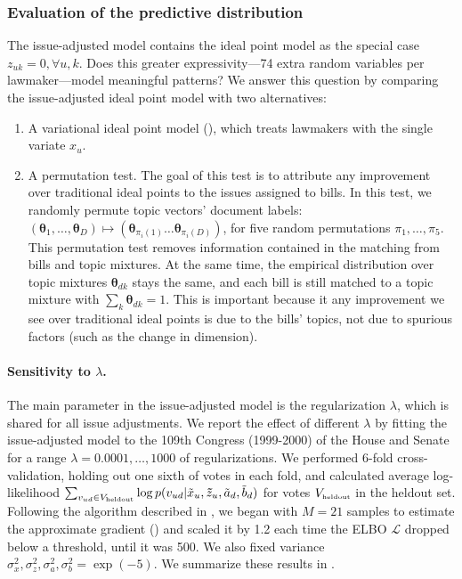 \subsubsection{Evaluation of the predictive distribution}

The issue-adjusted model contains the ideal point model as the
special case $z_{uk}=0, \forall u, k$. Does this greater
expressivity---74 extra random variables per lawmaker---model
meaningful patterns?  We answer this question by comparing the
issue-adjusted ideal point model with two alternatives:

\begin{enumerate}
\item A variational ideal point model (), which treats
  lawmakers with the single variate $x_u$.

\item A permutation test.  The goal of this test is to attribute any
  improvement over traditional ideal points to the issues assigned to
  bills.  In this test, we randomly permute topic vectors' document
  labels: $(\bm \theta_1, \ldots, \bm \theta_D) \mapsto (\bm
  \theta_{\pi_i(1)} \ldots \bm \theta_{\pi_i(D)})$, for five random
  permutations $\pi_1, \ldots, \pi_{5}$.  This permutation test
  removes information contained in the matching from bills and topic
  mixtures.  At the same time, the empirical distribution over topic
  mixtures $\bm \theta_{dk}$ stays the same, and each bill is still
  matched to a topic mixture with $\sum_k \bm \theta_{dk} = 1$.  This
  is important because it any improvement we see over traditional
  ideal points is due to the bills' topics, not due to spurious
  factors (such as the change in dimension).
\end{enumerate}

\label{sec:performance}
\paragraph{Sensitivity to $\lambda$.}
The main parameter in the issue-adjusted model is the regularization
$\lambda$, which is shared for all issue adjustments. We report the
effect of different $\lambda$ by fitting the issue-adjusted model to
the 109th Congress (1999-2000) of the House and Senate for a range
$\lambda=0.0001, \ldots, 1000$ of regularizations.  We performed
$6$-fold cross-validation, holding out one sixth of votes in each
fold, and calculated average log-likelihood $\sum_{v_{ud} \in
  V_{\mbox{\tiny heldout}}} \log p(v_{ud} | \tilde x_u, \bm \tilde
z_u, \tilde a_d, \tilde b_d)$ for votes $V_{\mbox{\tiny heldout}}$ in
the heldout set. Following the algorithm described in
, we began with $M=21$ samples to estimate the
approximate gradient () and scaled it by
1.2 each time the ELBO $\mathcal{L}$ dropped below a threshold, until
it was 500. We also fixed variance $\sigma_x^2, \sigma_z^2,
\sigma_a^2, \sigma_b^2=\exp({-}5)$.  We summarize these results in
.

